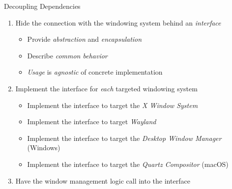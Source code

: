 \begin{secframe}{Decoupling Dependencies}



    \begin{enumerate}

        \item Hide the connection with the windowing system behind an \textit{interface}\\
            \begin{itemize}
                \item Provide \textit{abstraction} and \textit{encapsulation}
                \item Describe \textit{common behavior}
                \item \textit{Usage} is \textit{agnostic} of concrete implementation
            \end{itemize}

        \item Implement the interface for \textit{each} targeted windowing system\\
            \begin{itemize}
                \item Implement the interface to target the \textit{X Window System}
                \item Implement the interface to target \textit{Wayland}
                \item Implement the interface to target the \textit{Desktop Window Manager} (Windows)
                \item Implement the interface to target the \textit{Quartz Compositor} (macOS)
            \end{itemize}

        \item Have the window management logic call into the interface\\

    \end{enumerate}

    \vfill

\end{secframe}

